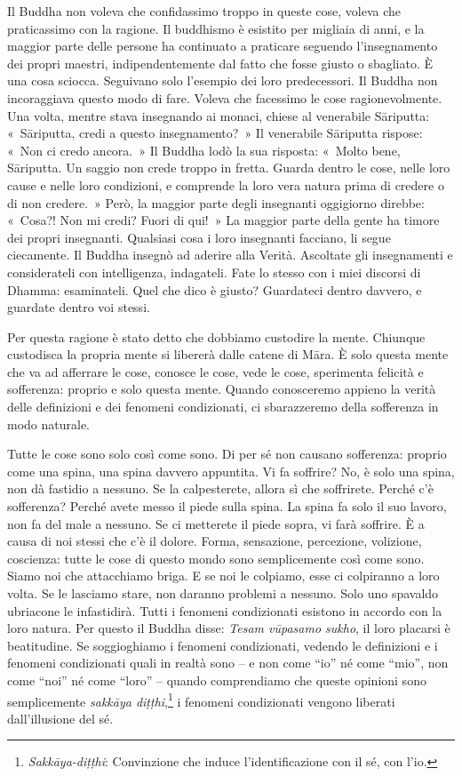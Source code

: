Il Buddha non voleva che confidassimo troppo in queste cose, voleva che
praticassimo con la ragione. Il buddhismo è esistito per migliaia di
anni, e la maggior parte delle persone ha continuato a praticare
seguendo l'insegnamento dei propri maestri, indipendentemente dal fatto
che fosse giusto o sbagliato. È una cosa sciocca. Seguivano solo
l'esempio dei loro predecessori. Il Buddha non incoraggiava questo modo
di fare. Voleva che facessimo le cose ragionevolmente. Una volta, mentre
stava insegnando ai monaci, chiese al venerabile Sāriputta: «~Sāriputta,
credi a questo insegnamento?~» Il venerabile Sāriputta rispose: «~Non ci
credo ancora.~» Il Buddha lodò la sua risposta: «~Molto bene, Sāriputta.
Un saggio non crede troppo in fretta. Guarda dentro le cose, nelle loro
cause e nelle loro condizioni, e comprende la loro vera natura prima di
credere o di non credere.~» Però, la maggior parte degli insegnanti
oggigiorno direbbe: «~Cosa?! Non mi credi? Fuori di qui!~» La maggior
parte della gente ha timore dei propri insegnanti. Qualsiasi cosa i loro
insegnanti facciano, li segue ciecamente. Il Buddha insegnò ad aderire
alla Verità. Ascoltate gli insegnamenti e considerateli con
intelligenza, indagateli. Fate lo stesso con i miei discorsi di Dhamma:
esaminateli. Quel che dico è giusto? Guardateci dentro davvero, e
guardate dentro voi stessi.

Per questa ragione è stato detto che dobbiamo custodire la mente.
Chiunque custodisca la propria mente si libererà dalle catene di Māra. È
solo questa mente che va ad afferrare le cose, conosce le cose, vede le
cose, sperimenta felicità e sofferenza: proprio e solo questa mente.
Quando conosceremo appieno la verità delle definizioni e dei fenomeni
condizionati, ci sbarazzeremo della sofferenza in modo naturale.

Tutte le cose sono solo così come sono. Di per sé non causano
sofferenza: proprio come una spina, una spina davvero appuntita. Vi fa
soffrire? No, è solo una spina, non dà fastidio a nessuno. Se la
calpesterete, allora sì che soffrirete. Perché c'è sofferenza? Perché
avete messo il piede sulla spina. La spina fa solo il suo lavoro, non fa
del male a nessuno. Se ci metterete il piede sopra, vi farà soffrire. È
a causa di noi stessi che c'è il dolore. Forma, sensazione, percezione,
volizione, coscienza: tutte le cose di questo mondo sono semplicemente
così come sono. Siamo noi che attacchiamo briga. E se noi le colpiamo,
esse ci colpiranno a loro volta. Se le lasciamo stare, non daranno
problemi a nessuno. Solo uno spavaldo ubriacone le infastidirà. Tutti i
fenomeni condizionati esistono in accordo con la loro natura. Per questo
il Buddha disse: \emph{Tesam vūpasamo sukho}, il loro placarsi è
beatitudine. Se soggioghiamo i fenomeni condizionati, vedendo le
definizioni e i fenomeni condizionati quali in realtà sono -- e non come
``io'' né come ``mio'', non come ``noi'' né come ``loro'' -- quando
comprendiamo che queste opinioni sono semplicemente \emph{sakkāya
diṭṭhi},\footnote{\emph{Sakkāya-diṭṭhi}: Convinzione che induce
  l'identificazione con il sé, con l'io.} i fenomeni condizionati
vengono liberati dall'illusione del sé.

